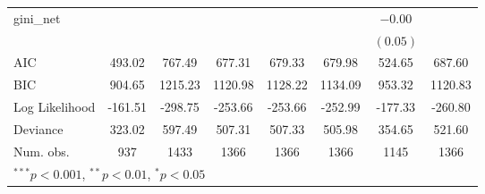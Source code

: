 \begin{tabular}{l c c c c c c c }
gini\_net                        &              &               &               &               &               & $-0.00$      &               \\
                                 &              &               &               &               &               & $(0.05)$     &               \\
\hline
AIC                              & 493.02       & 767.49        & 677.31        & 679.33        & 679.98        & 524.65       & 687.60        \\
BIC                              & 904.65       & 1215.23       & 1120.98       & 1128.22       & 1134.09       & 953.32       & 1120.83       \\
Log Likelihood                   & -161.51      & -298.75       & -253.66       & -253.66       & -252.99       & -177.33      & -260.80       \\
Deviance                         & 323.02       & 597.49        & 507.31        & 507.33        & 505.98        & 354.65       & 521.60        \\
Num. obs.                        & 937          & 1433          & 1366          & 1366          & 1366          & 1145         & 1366          \\
\hline
\multicolumn{8}{l}{\tiny{$^{***}p<0.001$, $^{**}p<0.01$, $^*p<0.05$}}
\end{tabular}
